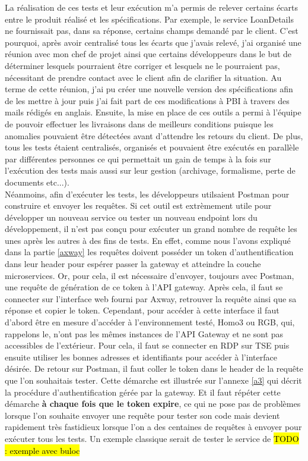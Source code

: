 	La réalisation de ces tests et leur exécution m'a permis de relever certains écarts entre le produit réalisé et les spécifications. Par exemple, le service LoanDetails ne fournissait pas, dans sa réponse, certains champs demandé par le client. C'est pourquoi, après avoir centralisé tous les écarts que j'avais relevé, j'ai organisé une réunion avec mon chef de projet ainsi que certains développeurs dans le but de déterminer lesquels pourraient être corriger et lesquels ne le pourraient pas, nécessitant de prendre contact avec le client afin de clarifier la situation. Au terme de cette réunion, j'ai pu créer une nouvelle version des spécifications afin de les mettre à jour puis j'ai fait part de ces modifications à PBI à travers des mails rédigés en anglais. Ensuite, la mise en place de ces outils a permi à l'équipe de pouvoir effectuer les livraisons dans de meilleurs conditions puisque les anomalies pouvaient être détectées avant d'attendre les retours du client. De plus, tous les tests étaient centralisés, organisés et pouvaient être exécutés en parallèle par différentes personnes ce qui permettait un gain de temps à la fois sur l'exécution des tests mais aussi sur leur gestion (archivage, formalisme, perte de documents etc...). \\
	
	Néanmoins, afin d'exécuter les tests, les développeurs utilsaient Postman pour construire et envoyer les requêtes. Si cet outil est extrèmement utile pour développer un nouveau service ou tester un nouveau endpoint lors du développement, il n'est pas conçu pour exécuter un grand nombre de requête les unes après les autres à des fins de tests. En effet, comme nous l'avons expliqué dans la partie \ref{axway} les requêtes doivent posséder un token d'authentification dans leur header pour espérer passer la gateway et atteindre la couche microservices. Or, pour cela, il est nécessaire d'envoyer, toujours avec Postman, une requête de génération de ce token à l'API gateway. Après cela, il faut se connecter sur l'interface web fourni par Axway, retrouver la requête ainsi que sa réponse et copier le token. Cependant, pour accéder à cette interface il faut d'abord être en mesure d'accéder à l'environnement testé, Homo3 ou RGB, qui, rappelons le, n'ont pas les mêmes instances de l'API Gateway et ne sont pas accessibles de l'extérieur. Pour cela, il faut se connecter en RDP sur TSE puis ensuite utiliser les bonnes adresses et identifiants pour accéder à l'interface désirée. De retour sur Postman, il faut coller le token dans le header de la requête que l'on souhaitais tester. Cette démarche est illustrée sur l'annexe \ref{a3} qui décrit la procédure d'authentification gérée par la gateway. Et il faut répéter cette démarche \textbf{à chaque fois que le token expire}, ce qui ne pose pas de problèmes lorsque l'on souhaite envoyer une requête pour tester son code mais devient rapidement très fastidieux lorsque l'on a des centaines de requêtes à envoyer pour exécuter tous les tests. 
	Un exemple classique serait de tester le service de \hl{TODO : exemple avec buloc}
	
